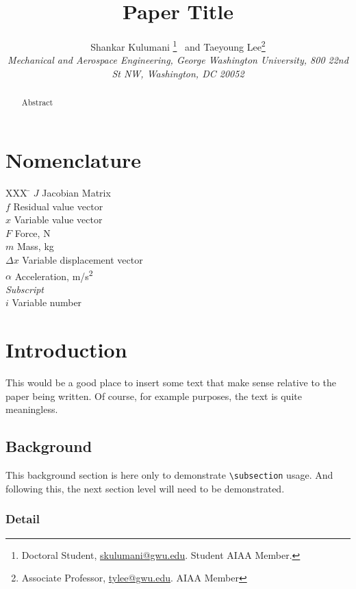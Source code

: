\documentclass[]{aiaa-tc}%
\title{Paper Title}
\author{
  Shankar Kulumani\thanksibid{1}%
    \thanks{Doctoral Student, \href{mailto:skulumani@gwu.edu}{skulumani@gwu.edu}. Student AIAA Member.}
  \ and Taeyoung Lee\thanksibid{2}\thanks{Associate Professor, \href{mailto:tylee@gwu.edu}{tylee@gwu.edu}. AIAA Member}\\
  {\normalsize\itshape
   Mechanical and Aerospace Engineering, George Washington University, 800 22nd St NW, Washington, DC 20052}\\
   }
\begin{document}
\maketitle

\begin{abstract}
Abstract
\end{abstract}

\section*{Nomenclature}

\begin{tabbing}
  XXX \= \kill%
  $J$ \> Jacobian Matrix \\
  $f$ \> Residual value vector \\
  $x$ \> Variable value vector \\
  $F$ \> Force, N \\
  $m$ \> Mass, kg \\
  $\Delta x$ \> Variable displacement vector \\
  $\alpha$ \> Acceleration, m/s\textsuperscript{2} \\[5pt]
  \textit{Subscript}\\
  $i$ \> Variable number \\
 \end{tabbing}

\section{Introduction}

This would be a good place to insert some text that make sense relative
to the paper being written.
Of course, for example purposes, the text is quite meaningless.

\subsection{Background}

This background section is here only to demonstrate \verb|\subsection|
usage.
And following this, the next section level will need to be demonstrated.

\subsubsection{Detail}
\end{document}
